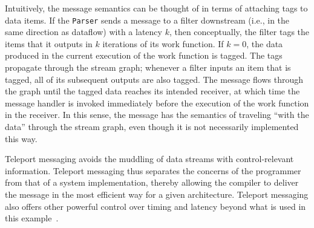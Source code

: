 Intuitively, the message semantics can be thought of in terms of
attaching tags to data items.  If the {\tt Parser} sends a message to
a filter downstream (i.e., in the same direction as dataflow) with a
latency $k$, then conceptually, the filter tags the items that it
outputs in $k$ iterations of its work function. If $k=0$, the data
produced in the current execution of the work function is tagged. The
tags propagate through the stream graph; whenever a filter inputs an
item that is tagged, all of its subsequent outputs are also
tagged. The message flows through the graph until the tagged data
reaches its intended receiver, at which time the message handler is
invoked immediately before the execution of the work function in the
receiver.  In this sense, the message has the semantics of traveling
``with the data'' through the stream graph, even though it is not
necessarily implemented this way.


Teleport messaging avoids the muddling of data streams with
control-relevant information. Teleport messaging thus separates the
concerns of the programmer from that of a system implementation,
thereby allowing the compiler to deliver the message in the most
efficient way for a given architecture. Teleport messaging also offers
other powerful control over timing and latency beyond what is used in
this example~\cite{thies05ppopp}.
